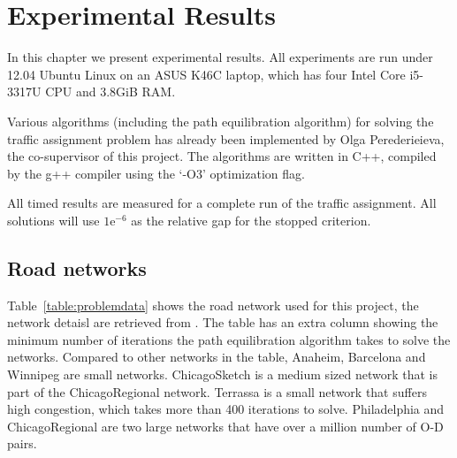 \chapter{Experimental Results}\label{chap:results}

In this chapter we present experimental results.
All experiments are run under 12.04 Ubuntu Linux on an ASUS K46C laptop,
which has four Intel Core i5-3317U CPU and 3.8GiB RAM.

Various algorithms (including the path equilibration algorithm) for solving
the traffic assignment problem has already been implemented by Olga Perederieieva, the co-supervisor of this project.
The algorithms are written in C++, compiled by the g++ compiler using the `-O3' optimization flag.

All timed results are measured for a complete run of the traffic assignment.
All solutions will use $1\text{e}^{-6}$ as the relative gap for the stopped criterion.

\section{Road networks}

Table~\ref{table:problemdata} shows the road network used for this project, the network detaisl are retrieved from \citet{ProblemData}.
The table has an extra column showing the minimum number of iterations the path equilibration algorithm takes to solve the networks.
Compared to other networks in the table,
Anaheim, Barcelona and Winnipeg are small networks.
ChicagoSketch is a medium sized network that is part of the ChicagoRegional network.
Terrassa is a small network that suffers high congestion, which takes more than 400 iterations to solve.
Philadelphia and ChicagoRegional are two large networks that have over a million number of O-D pairs.

